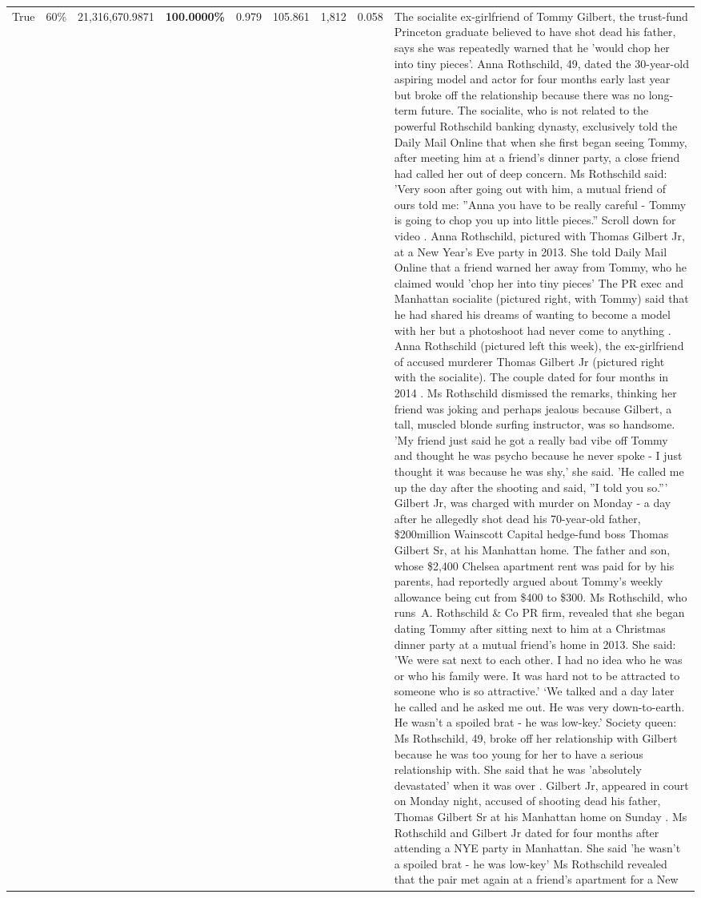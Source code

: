 \begin{table}[H]
\begin{tabular}{lllrlllll}
True & 60\% & 21,316,670.9871 & \bfseries \color{red} 100.0000\% & 0.979 & 105.861 & 1,812 & 0.058 & The socialite ex-girlfriend of Tommy Gilbert, the trust-fund Princeton graduate believed to have shot dead his father, says she was repeatedly warned that he 'would chop her into tiny pieces'. Anna Rothschild, 49, dated the 30-year-old aspiring model and actor for four months early last year but broke off the relationship because there was no long-term future. The socialite, who is not related to the powerful Rothschild banking dynasty, exclusively told the Daily Mail Online that when she first began seeing Tommy, after meeting him at a friend's dinner party, a close friend had called her out of deep concern. Ms Rothschild said: 'Very soon after going out with him, a mutual friend of ours told me: ''Anna you have to be really careful - Tommy is going to chop you up into little pieces.'' Scroll down for video . Anna Rothschild, pictured with Thomas Gilbert Jr, at a New Year's Eve party in 2013. She told Daily Mail Online that a friend warned her away from Tommy, who he claimed would 'chop her into tiny pieces' The PR exec and Manhattan socialite (pictured right, with Tommy) said that he had shared his dreams of wanting to become a model with her but a photoshoot had never come to anything . Anna Rothschild (pictured left this week), the ex-girlfriend of accused murderer Thomas Gilbert Jr (pictured right with the socialite). The couple dated for four months in 2014 . Ms Rothschild dismissed the remarks, thinking her friend was joking and perhaps jealous because Gilbert, a tall, muscled blonde surfing instructor, was so handsome. 'My friend just said he got a really bad vibe off Tommy and thought he was psycho because he never spoke - I just thought it was because he was shy,' she said. 'He called me up the day after the shooting and said, ''I told you so.''' Gilbert Jr, was charged with murder on Monday - a day after he allegedly shot dead his 70-year-old father, \$200million Wainscott Capital hedge-fund boss Thomas Gilbert Sr, at his Manhattan home. The father and son, whose \$2,400 Chelsea apartment rent was paid for by his parents, had reportedly argued about Tommy's weekly allowance being cut from \$400 to \$300. Ms Rothschild, who runs A. Rothschild \& Co PR firm, revealed that she began dating Tommy after sitting next to him at a Christmas dinner party at a mutual friend's home in 2013. She said: 'We were sat next to each other. I had no idea who he was or who his family were. It was hard not to be attracted to someone who is so attractive.' ‘We talked and a day later he called and he asked me out. He was very down-to-earth. He wasn’t a spoiled brat - he was low-key.’ Society queen: Ms Rothschild, 49, broke off her relationship with Gilbert because he was too young for her to have a serious relationship with. She said that he was 'absolutely devastated' when it was over . Gilbert Jr, appeared in court on Monday night, accused of shooting dead his father, Thomas Gilbert Sr at his Manhattan home on Sunday . Ms Rothschild and Gilbert Jr dated for four months after attending a NYE party in Manhattan. She said 'he wasn't a spoiled brat - he was low-key' Ms Rothschild revealed that the pair met again at a friend’s apartment for a New 
\end{tabular}
\end{table}

